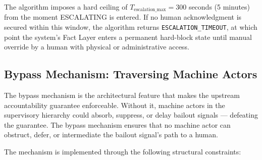 The algorithm imposes a hard ceiling of $T_{\text{escalation\_max}} = 300$ seconds (5 minutes) from the moment ESCALATING is entered. If no human acknowledgment is secured within this window, the algorithm returns \texttt{ESCALATION\_TIMEOUT}, at which point the system's Fact Layer enters a permanent hard-block state until manual override by a human with physical or administrative access.

\subsection{Bypass Mechanism: Traversing Machine Actors}

The bypass mechanism is the architectural feature that makes the upstream accountability guarantee enforceable. Without it, machine actors in the supervisory hierarchy could absorb, suppress, or delay bailout signals --- defeating the guarantee. The bypass mechanism ensures that no machine actor can obstruct, defer, or intermediate the bailout signal's path to a human.

The mechanism is implemented through the following structural constraints:

